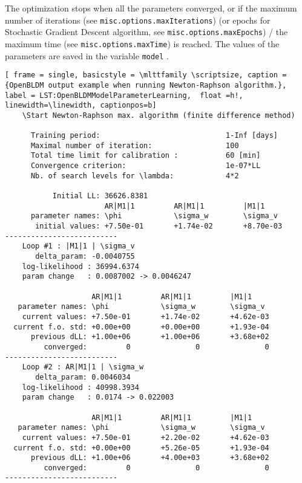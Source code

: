 The optimization stops when all the parameters converged, or if the maximum number of iterations (see \lstinline[basicstyle = \mlttfamily \small ]!misc.options.maxIterations!) (or epochs for Stochastic Gradient Descent algorithm, see \lstinline[basicstyle = \mlttfamily \small ]!misc.options.maxEpochs!) / the maximum time (see \lstinline[basicstyle = \mlttfamily \small ]!misc.options.maxTime!) is reached.
The values of the parameters are saved in the variable \lstinline[basicstyle = \mlttfamily \small ]!model! \MATLAB{}.
 
 \begin{lstlisting}[ frame = single, basicstyle = \mlttfamily \scriptsize, caption = {OpenBLDM output example when running Newton-Raphson algorithm.}, label = LST:OpenBLDMModelParameterLearning,  float =h!, linewidth=\linewidth, captionpos=b]
    \Start Newton-Raphson max. algorithm (finite difference method)

      Training period:                             1-Inf [days]
      Maximal number of iteration:                 100
      Total time limit for calibration :           60 [min]
      Convergence criterion:                       1e-07*LL
      Nb. of search levels for \lambda:            4*2

           Initial LL: 36626.8381
                       AR|M1|1         AR|M1|1         |M1|1            
      parameter names: \phi            \sigma_w        \sigma_v         
       initial values: +7.50e-01       +1.74e-02       +8.70e-03       
--------------------------
    Loop #1 : |M1|1 | \sigma_v 
       delta_param: -0.0040755 
    log-likelihood : 36994.6374
    param change   : 0.0087002 -> 0.0046247

                    AR|M1|1         AR|M1|1         |M1|1           
   parameter names: \phi            \sigma_w        \sigma_v        
    current values: +7.50e-01       +1.74e-02       +4.62e-03      
  current f.o. std: +0.00e+00       +0.00e+00       +1.93e-04      
      previous dLL: +1.00e+06       +1.00e+06       +3.68e+02      
         converged:         0               0               0      
--------------------------
    Loop #2 : AR|M1|1 | \sigma_w 
       delta_param: 0.0046034 
    log-likelihood : 40998.3934
    param change   : 0.0174 -> 0.022003

                    AR|M1|1         AR|M1|1         |M1|1           
   parameter names: \phi            \sigma_w        \sigma_v        
    current values: +7.50e-01       +2.20e-02       +4.62e-03      
  current f.o. std: +0.00e+00       +5.26e-05       +1.93e-04      
      previous dLL: +1.00e+06       +4.00e+03       +3.68e+02      
         converged:         0               0               0      
--------------------------
\end{lstlisting}



